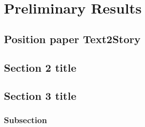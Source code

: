 \chapter{Preliminary Results}
\label{chap:results}

\section{Position paper Text2Story}

\section{Section 2 title}

\section{Section 3 title}

\subsection{Subsection}